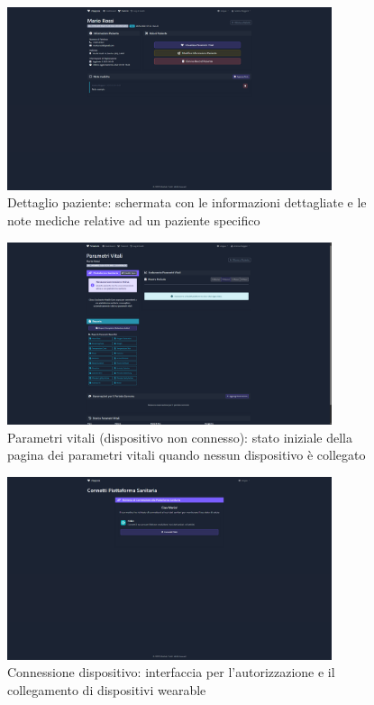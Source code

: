 \documentclass[12pt,a4paper,oneside]{report}
\begin{document}
\begin{figure}[H]
    \centering
    \includegraphics[width=0.85\textwidth]{images/screen/details.png}
  \caption{Dettaglio paziente: schermata con le informazioni dettagliate e le note mediche relative ad un paziente specifico}
    \label{fig:patient-details}
\end{figure}

\begin{figure}[H]
    \centering
    \includegraphics[width=0.85\textwidth]{images/screen/unconnected.png}
    \caption{Parametri vitali (dispositivo non connesso): stato iniziale della pagina dei parametri vitali quando nessun dispositivo è collegato}
    \label{fig:unconnected}
\end{figure}

\begin{figure}[H]
    \centering
    \includegraphics[width=0.85\textwidth]{images/screen/connection.png}
    \caption{Connessione dispositivo: interfaccia per l'autorizzazione e il collegamento di dispositivi wearable}
    \label{fig:connection}
\end{figure}
\end{document}

